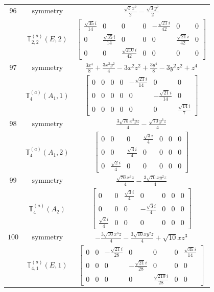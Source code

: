 \documentclass[fleqn,8pt,landscape]{jsarticle}
\begin{document}
\begin{longtable}{ccc}
$ 96 $ & $ \text{symmetry} $ & $ \frac{\sqrt{3} x^{2}}{2} - \frac{\sqrt{3} y^{2}}{2} $ \\
$  $ & $ \mathbb{T}_{2,2}^{(a)}(E,2) $ & $ \begin{bmatrix} \frac{\sqrt{35} i}{14} & 0 & 0 & 0 & - \frac{\sqrt{21} i}{42} & 0 & 0 \\ 0 & \frac{\sqrt{35} i}{14} & 0 & 0 & 0 & \frac{\sqrt{21} i}{42} & 0 \\ 0 & 0 & \frac{\sqrt{210} i}{42} & 0 & 0 & 0 & 0 \end{bmatrix} $ \\ \hline
$ 97 $ & $ \text{symmetry} $ & $ \frac{3 x^{4}}{8} + \frac{3 x^{2} y^{2}}{4} - 3 x^{2} z^{2} + \frac{3 y^{4}}{8} - 3 y^{2} z^{2} + z^{4} $ \\
$  $ & $ \mathbb{T}_{4}^{(a)}(A_{1},1) $ & $ \begin{bmatrix} 0 & 0 & 0 & 0 & - \frac{\sqrt{21} i}{14} & 0 & 0 \\ 0 & 0 & 0 & 0 & 0 & - \frac{\sqrt{21} i}{14} & 0 \\ 0 & 0 & 0 & 0 & 0 & 0 & \frac{\sqrt{14} i}{7} \end{bmatrix} $ \\ \hline
$ 98 $ & $ \text{symmetry} $ & $ \frac{3 \sqrt{70} x^{2} y z}{4} - \frac{\sqrt{70} y^{3} z}{4} $ \\
$  $ & $ \mathbb{T}_{4}^{(a)}(A_{1},2) $ & $ \begin{bmatrix} 0 & 0 & 0 & \frac{\sqrt{3} i}{4} & 0 & 0 & 0 \\ 0 & 0 & \frac{\sqrt{3} i}{4} & 0 & 0 & 0 & 0 \\ 0 & \frac{\sqrt{2} i}{4} & 0 & 0 & 0 & 0 & 0 \end{bmatrix} $ \\ \hline
$ 99 $ & $ \text{symmetry} $ & $ \frac{\sqrt{70} x^{3} z}{4} - \frac{3 \sqrt{70} x y^{2} z}{4} $ \\
$  $ & $ \mathbb{T}_{4}^{(a)}(A_{2}) $ & $ \begin{bmatrix} 0 & 0 & \frac{\sqrt{3} i}{4} & 0 & 0 & 0 & 0 \\ 0 & 0 & 0 & - \frac{\sqrt{3} i}{4} & 0 & 0 & 0 \\ \frac{\sqrt{2} i}{4} & 0 & 0 & 0 & 0 & 0 & 0 \end{bmatrix} $ \\ \hline
$ 100 $ & $ \text{symmetry} $ & $ - \frac{3 \sqrt{10} x^{3} z}{4} - \frac{3 \sqrt{10} x y^{2} z}{4} + \sqrt{10} x z^{3} $ \\
$  $ & $ \mathbb{T}_{4,1}^{(a)}(E,1) $ & $ \begin{bmatrix} 0 & 0 & - \frac{\sqrt{21} i}{28} & 0 & 0 & 0 & \frac{\sqrt{35} i}{14} \\ 0 & 0 & 0 & - \frac{\sqrt{21} i}{28} & 0 & 0 & 0 \\ 0 & 0 & 0 & 0 & \frac{\sqrt{210} i}{28} & 0 & 0 \end{bmatrix} $ \\ \hline

\end{longtable}
\end{document}
